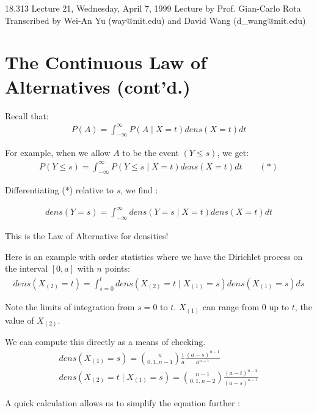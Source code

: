 {\Large 18.313 Lecture 21, Wednesday, April 7, 1999}\newline 
{\large Lecture by Prof. Gian-Carlo Rota}\newline 
Transcribed by Wei-An Yu (way@mit.edu) and David Wang (d\_wang@mit.edu)\\

\section{The Continuous Law of Alternatives (cont'd.)}
Recall that:
\begin{eqnarray*}
P(A) = \int_{- \infty}^{\infty} P(A \mid X = t) dens(X = t) dt
\end{eqnarray*}

For example, when we allow $A$ to be the event $(Y \leq s)$, we get:
\begin{eqnarray*}
P(Y \leq s) = \int_{- \infty}^{\infty} P(Y \leq s \mid X = t) dens(X = t) dt \qquad (*)
\end{eqnarray*}

Differentiating (*) relative to $s$, we find :

\begin{eqnarray*}
dens(Y = s) = \int_{- \infty}^{\infty} dens(Y = s \mid X = t) dens(X = t) dt
\end{eqnarray*}

This is the Law of Alternative for densities!

Here is an example with order statistics where we have the Dirichlet process on the interval $[0, a]$ with $n$ points:
\begin{eqnarray*}
dens(X_{(2)} = t) = \int_{s = 0}^{t} dens(X_{(2)} = t \mid X_{(1)} = s) dens(X_{(1)} = s) ds
\end{eqnarray*}

Note the limits of integration from $s = 0$ to $t$.  $X_{(1)}$ can range from $0$ up to $t$, the value of $X_{(2)}$.

We can compute this directly as a means of checking.
\begin{eqnarray*}
dens(X_{(1)} = s) = {{n} \choose {0, 1, n - 1}} \frac {1}{a} \frac {(a - s)^{n - 1}}{a^{n - 1}}\\
dens(X_{(2)} = t \mid X_{(1)} = s) = {{n - 1} \choose {0, 1, n - 2}} \frac {(a - t)^{n - 2}}{(a - s)^{n - 1}}
\end{eqnarray*}

A quick calculation allows us to simplify the equation further :

